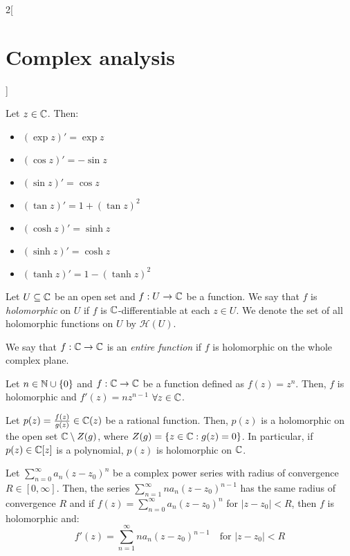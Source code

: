 \documentclass[../../../main.tex]{subfiles}
\begin{document}
\begin{multicols}{2}[\section{Complex analysis}]
\begin{theorem}
  \end{theorem}
  \begin{proposition}
    Let $z\in\mathbb{C}$. Then:
    \begin{itemize}
      \item ${\left(\exp{z}\right)}'=\exp{z}$
      \item ${\left(\cos{z}\right)}'=-\sin{z}$
      \item ${\left(\sin{z}\right)}'=\cos{z}$
      \item ${\left(\tan{z}\right)}'=1+{(\tan{z})}^2$
      \item ${\left(\cosh{z}\right)}'=\sinh{z}$
      \item ${\left(\sinh{z}\right)}'=\cosh{z}$
      \item ${\left(\tanh{z}\right)}'=1-{(\tanh{z})}^2$
    \end{itemize}
  \end{proposition}
  \begin{definition}
    Let $U\subseteq \mathbb{C}$ be an open set and $f:U\rightarrow \mathbb{C}$ be a function. We say that $f$ is \emph{holomorphic} on $U$ if $f$ is $\mathbb{C}$-differentiable at each $z\in U$. We denote the set of all holomorphic functions on $U$ by $\mathcal{H}(U)$.
  \end{definition}
  \begin{definition}
    We say that $f:\mathbb{C}\rightarrow\mathbb{C}$ is an \emph{entire function} if $f$ is holomorphic on the whole complex plane.
  \end{definition}
  \begin{proposition}
    Let $n\in\mathbb{N}\cup\{0\}$ and $f:\mathbb{C}\rightarrow\mathbb{C}$ be a function defined as  $f(z)=z^n$. Then, $f$ is holomorphic and $f'(z)=nz^{n-1}$ $\forall z\in\mathbb{C}$.
  \end{proposition}
  \begin{corollary}
    Let $p(z)=\frac{f(z)}{g(z)}\in\mathbb{C}(z)$ be a rational function. Then, $p(z)$ is a holomorphic on the open set $\mathbb{C}\setminus Z(g)$, where $Z(g)=\{z\in\mathbb{C}:g(z)=0\}$.
    In particular, if $p(z)\in\mathbb{C}[z]$ is a polynomial, $p(z)$ is holomorphic on $\mathbb{C}$.
  \end{corollary}
  \begin{theorem}
    Let $\sum_{n=0}^\infty a_n{(z-z_0)}^n$ be a complex power series with radius of convergence $R\in[0,\infty]$. Then, the series $\sum_{n=1}^\infty na_n{(z-z_0)}^{n-1}$ has the same radius of convergence $R$ and if $f(z)=\sum_{n=0}^\infty a_n{(z-z_0)}^n$ for $|z-z_0|<R$, then $f$ is holomorphic and: $$f'(z)=\sum_{n=1}^\infty na_n{(z-z_0)}^{n-1}\quad\text{for } |z-z_0|<R$$

\end{theorem}
\end{multicols}
\end{document}
